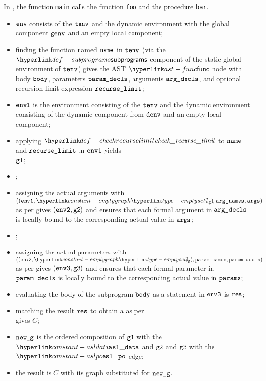 In ,
the function \texttt{main} calls the function \texttt{foo} and the procedure \texttt{bar}.

\ProseParagraph
\AllApply
\begin{itemize}
  \item $\texttt{env}$ consists of the \staticenvironmentterm{} $\texttt{tenv}$ and the dynamic environment with the global
        component $\texttt{genv}$ and an empty local component;
  \item finding the function named $\texttt{name}$ in $\texttt{tenv}$ (via the $\subprograms$ component of the static global environment of $\texttt{tenv}$)
        gives the AST $\func$ node with body
        $\texttt{body}$, parameters $\texttt{param\_decls}$, arguments $\texttt{arg\_decls}$, and optional recursion limit expression $\texttt{recurse\_limit}$;
  \item $\texttt{env1}$ is the environment consisting of the \staticenvironmentterm{} $\texttt{tenv}$ and the dynamic
        environment consisting of the dynamic component from $\texttt{denv}$ and an empty local component;
  \item applying $\checkrecurselimit$ to $\texttt{name}$ and $\texttt{recurse\_limit}$ in $\texttt{env1}$ yields \\
        $\texttt{g1}$\ProseOrDynErrorDiverging;
  \item {};
  \item assigning the actual arguments with $((\envone, \emptygraph), \argnames, \args)$
        as per  gives $(\texttt{env2}, \texttt{g2})$ and ensures that each
        formal argument in $\texttt{arg\_decls}$ is
        locally bound to the corresponding actual value in $\texttt{args}$;
  \item {};
  \item assigning the actual parameters with $((\envtwo, \emptygraph), \paramnames, \paramdecls)$
        as per  gives $(\texttt{env3}, \texttt{g3})$ and ensures that each
        formal parameter in $\texttt{param\_decls}$ is
        locally bound to the corresponding actual value in $\texttt{params}$;
  \item evaluating the body of the subprogram $\texttt{body}$ as a statement in $\texttt{env3}$
        is $\texttt{res}$\ProseOrAbnormal;
  \item matching the result $\texttt{res}$ to obtain a \Prosenormalconfiguration{} as per \\
         gives $C$;
  \item $\texttt{new\_g}$ is the ordered composition of $\texttt{g1}$ with the $\asldata$ and $\texttt{g2}$ and $\texttt{g3}$ with the $\aslpo$ edge;
  \item the result is $C$ with its graph substituted for $\texttt{new\_g}$.
\end{itemize}

